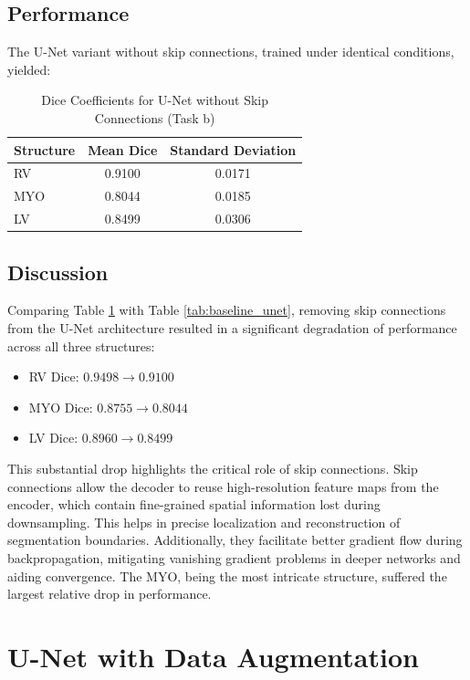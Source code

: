 \documentclass{article}
\begin{document}
\subsection{Performance}
The U-Net variant without skip connections, trained under identical conditions, yielded:
\begin{table}[H]
  \centering
  \caption{Dice Coefficients for U-Net without Skip Connections (Task b)}
  \label{tab:no_shortcut_unet}
  \begin{tabular}{lcc}
    \toprule
    Structure & Mean Dice & Standard Deviation \\
    \midrule
    RV        & 0.9100    & 0.0171             \\
    MYO       & 0.8044    & 0.0185             \\
    LV        & 0.8499    & 0.0306             \\
    \bottomrule
  \end{tabular}
\end{table}

\subsection{Discussion}
Comparing Table \ref{tab:no_shortcut_unet} with Table \ref{tab:baseline_unet}, removing skip connections from the U-Net architecture
resulted in a significant degradation of performance across all three structures:
\begin{itemize}
  \item RV Dice: $0.9498 \rightarrow 0.9100$
  \item MYO Dice: $0.8755 \rightarrow 0.8044$
  \item LV Dice: $0.8960 \rightarrow 0.8499$
\end{itemize}
This substantial drop highlights the critical role of skip connections. Skip connections allow the decoder to reuse high-resolution
feature maps from the encoder, which contain fine-grained spatial information lost during downsampling. This helps in precise
localization and reconstruction of segmentation boundaries. Additionally, they facilitate better gradient flow during backpropagation,
mitigating vanishing gradient problems in deeper networks and aiding convergence. The MYO, being the most intricate structure,
suffered the largest relative drop in performance.



\section{U-Net with Data Augmentation}
\end{document}
